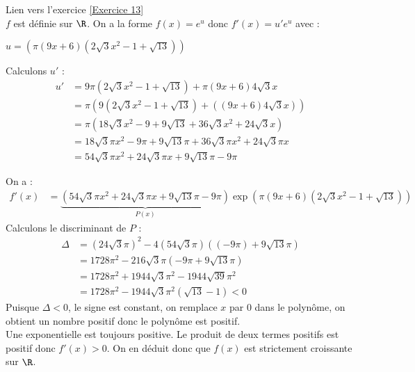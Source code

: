 \documentclass[12pt,fleqn]{report} %
\begin{document}
\begin{correction}Lien vers l'exercice   \ref{Exercice 13}\\
	$f$ est définie sur $\R$.
	On a la forme $f(x)=e^u$ donc $f'(x)=u'e^u$ avec :
	\begin{center}
		$u=\left(\pi(9x+6)(2\sqrt{3}x^2-1+\sqrt{13})\right)$
	\end{center}
	Calculons $u'$ : 
	\begin{align*}
	u' & = 9\pi(2\sqrt{3}x^2-1+\sqrt{13})+\pi(9x+6)4\sqrt{3}x \\ & = \pi\left(9(2\sqrt{3}x^2-1+\sqrt{13})+\left((9x+6)4\sqrt{3}x\right)\right) \\ & = \pi\left(18\sqrt{3}x^2-9+9\sqrt{13}+36\sqrt{3}x^2+24\sqrt{3}x\right) \\ & = 18\sqrt{3}\pi x^2-9\pi+9\sqrt{13}\pi+36\sqrt{3}\pi x^2+24\sqrt{3}\pi x \\ & = 54\sqrt{3}\pi x^2+24\sqrt{3}\pi x +9\sqrt{13}\pi-9\pi
	\end{align*}
	
	On a :
	\begin{align*}
	f'(x) & =\underbrace{\left(54\sqrt{3}\pi x^2+24\sqrt{3}\pi x +9\sqrt{13}\pi-9\pi\right)}_{P(x)}\exp\left(\pi(9x+6)(2\sqrt{3}x^2-1+\sqrt{13})\right)
	\end{align*}
	Calculons le discriminant de $P$ :
	\begin{align*}
	\Delta & = (24\sqrt{3}\pi)^2-4(54\sqrt{3}\pi)\left((-9\pi)+9\sqrt{13}\pi\right) \\ & = 1728\pi^2-216\sqrt{3}\pi(-9\pi+9\sqrt{13}\pi) \\ & = 1728\pi^2+1944\sqrt{3}\pi^2-1944\sqrt{39}\pi^2 \\ & = 1728\pi^2-1944\sqrt{3}\pi^2(\sqrt{13} - 1)< 0
	\end{align*}
	Puisque $\Delta <0 $, le signe est constant, on remplace $x$ par $0$ dans le polynôme, on obtient un nombre positif donc le polynôme est positif.
	\\	Une exponentielle est toujours positive.
	Le produit de deux termes positifs est positif donc $f'(x)>0$.
	On en déduit donc que $f(x)$ est strictement croissante sur $\R$.
\end{correction}
\end{document}
